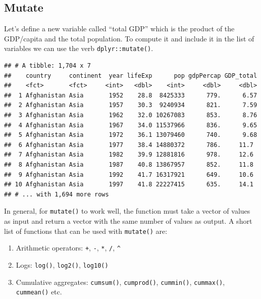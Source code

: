 \documentclass[11pt,]{article}
\newenvironment{Shaded}{\begin{snugshade}}{\end{snugshade}}
\newcommand{\KeywordTok}[1]{\textcolor[rgb]{0.13,0.29,0.53}{\textbf{#1}}}
\newcommand{\DataTypeTok}[1]{\textcolor[rgb]{0.13,0.29,0.53}{#1}}
\newcommand{\DecValTok}[1]{\textcolor[rgb]{0.00,0.00,0.81}{#1}}
\newcommand{\StringTok}[1]{\textcolor[rgb]{0.31,0.60,0.02}{#1}}
\newcommand{\CommentTok}[1]{\textcolor[rgb]{0.56,0.35,0.01}{\textit{#1}}}
\newcommand{\OperatorTok}[1]{\textcolor[rgb]{0.81,0.36,0.00}{\textbf{#1}}}
\newcommand{\NormalTok}[1]{#1}
\providecommand{\tightlist}{%
  \setlength{\itemsep}{0pt}\setlength{\parskip}{0pt}}
\begin{document}
\subsection{Mutate}\label{mutate}

Let's define a new variable called ``total GDP'' which is the product of
the GDP/capita and the total population. To compute it and include it in
the list of variables we can use the verb \texttt{dplyr::mutate()}.

\begin{Shaded}
\end{Shaded}

\begin{verbatim}
## # A tibble: 1,704 x 7
##    country     continent  year lifeExp      pop gdpPercap GDP_total
##    <fct>       <fct>     <int>   <dbl>    <int>     <dbl>     <dbl>
##  1 Afghanistan Asia       1952    28.8  8425333      779.      6.57
##  2 Afghanistan Asia       1957    30.3  9240934      821.      7.59
##  3 Afghanistan Asia       1962    32.0 10267083      853.      8.76
##  4 Afghanistan Asia       1967    34.0 11537966      836.      9.65
##  5 Afghanistan Asia       1972    36.1 13079460      740.      9.68
##  6 Afghanistan Asia       1977    38.4 14880372      786.     11.7 
##  7 Afghanistan Asia       1982    39.9 12881816      978.     12.6 
##  8 Afghanistan Asia       1987    40.8 13867957      852.     11.8 
##  9 Afghanistan Asia       1992    41.7 16317921      649.     10.6 
## 10 Afghanistan Asia       1997    41.8 22227415      635.     14.1 
## # ... with 1,694 more rows
\end{verbatim}

In general, for \texttt{mutate()} to work well, the function must take a
vector of values as input and return a vector with the same number of
values as output. A short list of functions that can be used with
\texttt{mutate()} are:

\begin{enumerate}
\def\labelenumi{\arabic{enumi}.}
\tightlist
\item
  Arithmetic operators: \texttt{+}, \texttt{-}, \texttt{*}, \texttt{/},
  \texttt{\^{}}
\item
  Logs: \texttt{log()}, \texttt{log2()}, \texttt{log10()}
\item
  Cumulative aggregates: \texttt{cumsum()}, \texttt{cumprod()},
  \texttt{cummin()}, \texttt{cummax()}, \texttt{cummean()} etc.
\end{enumerate}
\end{document}
